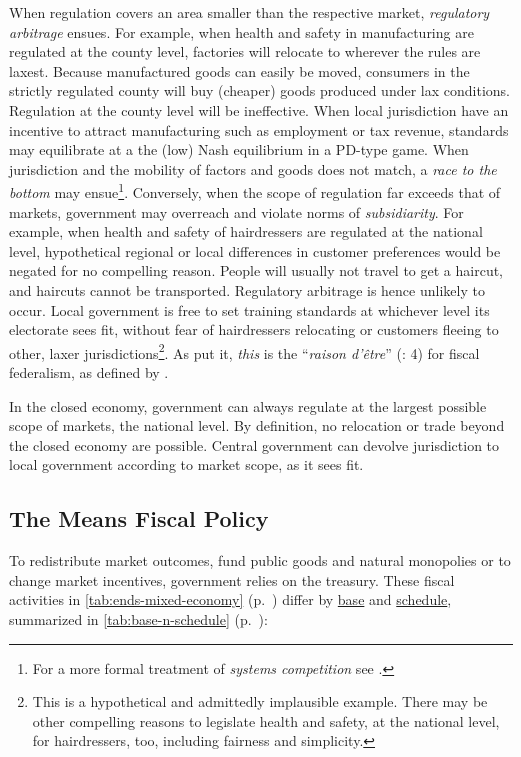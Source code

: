\begin{description}
	When regulation covers an area smaller than the respective market, \emph{regulatory arbitrage} ensues. For example, when health and safety in manufacturing are regulated at the county level, factories will relocate to wherever the rules are laxest. Because manufactured goods can easily be moved, consumers in the strictly regulated county will buy (cheaper) goods produced under lax conditions. Regulation at the county level will be ineffective. When local jurisdiction have an incentive to attract manufacturing such as employment or tax revenue, standards may equilibrate at a the (low) Nash equilibrium in a \gls{PD}-type game. When jurisdiction and the mobility of factors and goods does not match, a \emph{race to the bottom} may ensue\footnote{
		For a more formal treatment of \emph{systems competition} see \cite{Sinn2004}.}. 
	Conversely, when the scope of regulation far exceeds that of markets, government may overreach and violate norms of \emph{subsidiarity}. For example, when health and safety of hairdressers are regulated at the national level, hypothetical regional or local differences in customer preferences would be negated for no compelling reason. People will usually not travel to get a haircut, and haircuts cannot be transported. Regulatory arbitrage is hence unlikely to occur. Local government is free to set training standards at whichever level its electorate sees fit, without fear of hairdressers relocating or customers fleeing to other, laxer jurisdictions\footnote{
		This is a hypothetical and admittedly implausible example. There may be other compelling reasons to legislate health and safety, at the national level, for hairdressers, too, including fairness and simplicity.}.
	As \citeauthor{Bordo2011} put it, \emph{this} is the ``\emph{raison d'\^{e}tre}'' (\citeyear{Bordo2011}: 4) for fiscal federalism, as defined by \cite{Oates1972}.

	In the closed economy, government can always regulate at the largest possible scope of markets, the national level. By definition, no relocation or trade beyond the closed economy are possible. Central government can devolve jurisdiction to local government according to market scope, as it sees fit.

\end{description}

\subsection[Fiscal Policy]{The Means Fiscal Policy} \label{sec:fiscal}
To redistribute market outcomes, fund public goods and natural monopolies or to change market incentives, government relies on the treasury. These fiscal activities in \autoref{tab:ends-mixed-economy} (p.~\pageref{tab:ends-mixed-economy}) differ by \hyperref[itm:base]{base} and \hyperref[itm:schedule]{schedule}, summarized in \autoref{tab:base-n-schedule} (p.~\pageref{tab:base-n-schedule}):

